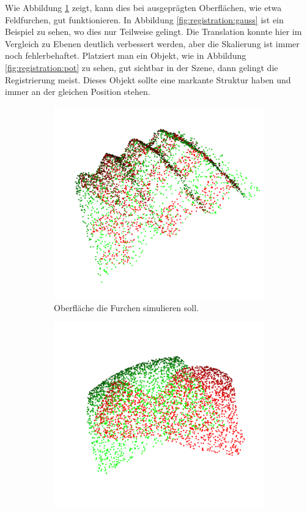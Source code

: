 \documentclass[12pt,titlepage, twoside]{article}
\begin{document}
Wie Abbildung \ref{fig:registration:sinus} zeigt, kann dies bei ausgeprägten Oberflächen, wie etwa Feldfurchen, gut funktionieren. 
In Abbildung \ref{fig:registration:gauss} ist ein Beispiel zu sehen, wo dies nur Teilweise gelingt. Die Translation konnte hier im Vergleich zu Ebenen deutlich verbessert werden, aber die Skalierung ist immer noch fehlerbehaftet.
Platziert man ein Objekt, wie in Abbildung \ref{fig:registration:pot} zu sehen, gut sichtbar in der Szene, dann gelingt die Registrierung meist. 
Dieses Objekt sollte eine markante Struktur haben und immer an der gleichen Position stehen.

\begin{figure}[htb]
    \centering 
\begin{subfigure}{0.3\textwidth}
  \includegraphics[width=\linewidth]{./Images/Registration_Sinus.png}
  \caption{Oberfläche die Furchen simulieren soll.}
  \label{fig:registration:sinus}
\end{subfigure}\hfil
\begin{subfigure}{0.3\textwidth}
  \includegraphics[width=\linewidth]{./Images/Registration_Gauss.png}

\end{subfigure}
\end{figure}
\end{document}
